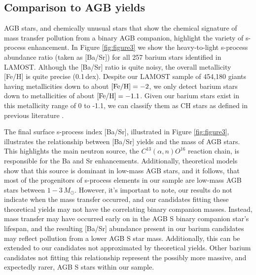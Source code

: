 \documentclass[a4paper,fleqn,usenatbib]{mnras}
\begin{document}
\subsection{Comparison to AGB yields}
AGB stars, and chemically unusual stars that show the chemical signature of mass transfer pollution from a binary AGB companion, highlight the variety of s-process enhancement. In Figure \ref{fig:figure3} we show the heavy-to-light s-process abundance ratio (taken as [Ba/Sr]) for all 257 barium stars identified in LAMOST. Although the [Ba/Sr] ratio is quite noisy, the overall metallicity [Fe/H] is quite precise (0.1\,dex). Despite our LAMOST sample of 454,180 giants having metallicities down to about $[{\rm Fe/H}] = -2$, we only detect barium stars down to metallicities of about $[{\rm Fe/H}] = -1.1$. Given our barium stars exist in this metallicity range of 0 to -1.1, we can classify them as CH stars as defined in previous literature \citep[e.g.][]{luck1991, mcclure1997}.

The final surface s-process index [Ba/Sr], illustrated in Figure \ref{fig:figure3}, illustrates the relationship between [Ba/Sr] yields and the mass of AGB stars. This highlights the main neutron source, the $C^{13}(\alpha,n)O^{16}$ reaction chain, is responsible for the Ba and Sr enhancements. Additionally, theoretical models show that this source is dominant in low-mass AGB stars, and it follows, that most of the progenitors of s-process elements in our sample are low-mass AGB stars between $1 - 3\,M_{\odot}$. However, it's important to note, our results do not indicate when the mass transfer occurred, and our candidates fitting these theoretical yields may not have the correlating binary companion masses. Instead, mass transfer may have occurred early on in the AGB S binary companion star's lifespan, and the resulting [Ba/Sr] abundance present in our barium candidates may reflect pollution from a lower AGB S star mass. Additionally, this can be extended to our candidates not approximated by theoretical yields. Other barium candidates not fitting this relationship represent the possibly more massive, and expectedly rarer, AGB S stars within our sample.

\end{document}
